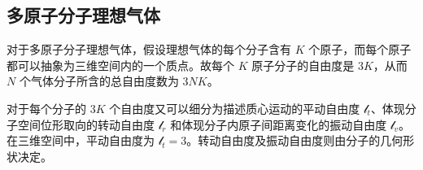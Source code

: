 \subsection{多原子分子理想气体}
对于多原子分子理想气体，假设理想气体的每个分子含有 $K$ 个原子，而每个原子都可以抽象为三维空间内的一个质点。故每个 $K$ 原子分子的自由度是 $3K$，从而 $N$ 个气体分子所含的总自由度数为 $3NK$。

对于每个分子的 $3K$ 个自由度又可以细分为描述质心运动的平动自由度 $\mathcal{l}_t$、体现分子空间位形取向的转动自由度 $\mathcal{l}_r$ 和体现分子内原子间距离变化的振动自由度 $\mathcal{l}_v$。在三维空间中，平动自由度为 $\mathcal{l}_t = 3$。转动自由度及振动自由度则由分子的几何形状决定。